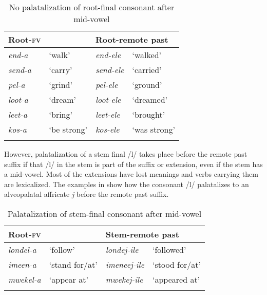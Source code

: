 \documentclass[output=paper]{langsci/langscibook}
\begin{document}
\begin{table}
\begin{tabularx}{.75\textwidth}{llll}
\lsptoprule
Root-\textsc{fv} &  & \multicolumn{2}{l}{Root-remote past} \\
\midrule
\textit{end-a} & `walk' & \textit{end-ele} & `walked' \\
\textit{send-a} & `carry' & \textit{send-ele} & `carried' \\
\textit{pel-a} & `grind' & \textit{pel-ele} & `ground' \\
\textit{loot-a} & `dream' & \textit{loot-ele} & `dreamed' \\
\textit{leet-a} & `bring' & \textit{leet-ele} & `brought' \\
\textit{kos-a} & `be strong' & \textit{kos-ele} & `was strong' \\

\lspbottomrule
\end{tabularx}

\caption{No palatalization of root-final consonant after mid-vowel }
\label{tab:16.kawasha}

\end{table}


However, palatalization of a stem final /l/ takes place before the remote past suffix if that /l/ in the stem is part of the suffix or extension, even if the stem has a mid-vowel. Most of the extensions have lost meanings and verbs carrying them are lexicalized. The examples in  show how the consonant /l/ palatalizes to an alveopalatal affricate \textit{j} before the remote past suffix.

\begin{table}
\begin{tabularx}{\textwidth}{XXXX}
\lsptoprule
Root-\textsc{fv} &  & \multicolumn{2}{l}{Stem-remote past} \\
\midrule
\textit{londel-a} & `follow' & \textit{londej-ile} & `followed' \\
\textit{imeen-a} & `stand for/at' & \textit{imeneej-ile} & `stood for/at' \\
\textit{mwekel-a} & `appear at' & \textit{mwekej-ile} & `appeared at' \\

\lspbottomrule
\end{tabularx}

\caption{Palatalization of stem-final consonant after mid-vowel}
\label{tab:17.kawasha}

\end{table}
\end{document}
